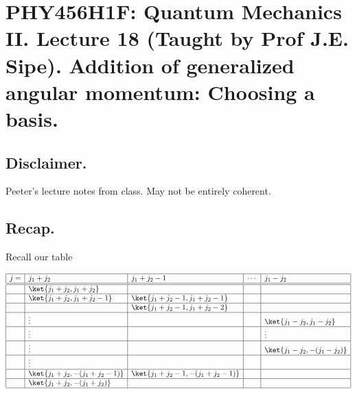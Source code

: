 
%

\chapter{PHY456H1F: Quantum Mechanics II.  Lecture 18 (Taught by Prof J.E. Sipe).  Addition of generalized angular momentum: Choosing a basis.}
\label{chap:qmTwoL18}
{}
\date{Nov 12, 2011}

\beginArtWithToc

\section{Disclaimer.}

Peeter's lecture notes from class.  May not be entirely coherent.

\section{Recap.}

Recall our table

\begin{equation}\label{eqn:qmTwoL18:10}
\begin{array}{| l | l | l | l | l |}
\hline
j = & j_1 + j_2				& j_1 + j_2 -1 				& \cdots 	& j_1 - j_2 \\
\hline
\hline
  &  \ket{j_1 + j_2, j_1 + j_2}	 	&					& 		& \\
\hline
  &  \ket{j_1 + j_2, j_1 + j_2 - 1}	&  \ket{j_1 + j_2 - 1, j_1 + j_2 - 1}	& 		& \\
\hline
  &                                     & \ket{j_1 + j_2 - 1, j_1 + j_2 - 2}	& 		& \\
\hline
  & \vdots 	 			&					& 		& \ket{j_1 - j_2, j_1 - j_2} \\
\hline
  & \vdots 	 			&					& 		& \vdots \\
\hline
  & \vdots 	 			&					& 		& \ket{j_1 - j_2, -(j_1 - j_2)} \\
\hline
  & \vdots 	 			&					& 		& \\
\hline
  &  \ket{j_1 + j_2, -(j_1 + j_2 - 1)}	& \ket{j_1 + j_2 -1, -(j_1 + j_2 - 1)}	& 		& \\
\hline
  &  \ket{j_1 + j_2, -(j_1 + j_2)}	&					& 		&  \\
\hline
\end{array}
\end{equation}

